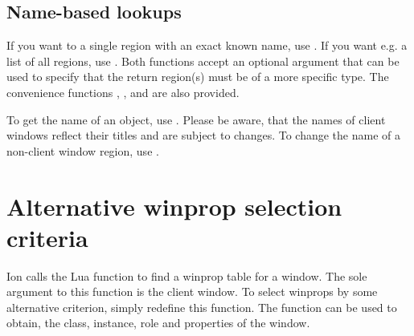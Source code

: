 \subsection{Name-based lookups}

If you want to a single region with an exact known name, use
. If you want e.g. a list of all regions,
use . Both functions accept an
optional argument that can be used to specify that the return region(s)
must be of a more specific type. The convenience functions
, ,
 and  are also
provided.

To get the name of an object, use . Please be
aware, that the names of client windows reflect their titles and
are subject to changes. To change the name of a non-client window
region, use .


\section{Alternative winprop selection criteria}

Ion calls the Lua function  to find a winprop
table for a window. The sole argument to this function is the
client window. To select winprops by some alternative criterion,
simply redefine this function. The function 
can be used to obtain, the class, instance, role and 
properties of the window.




